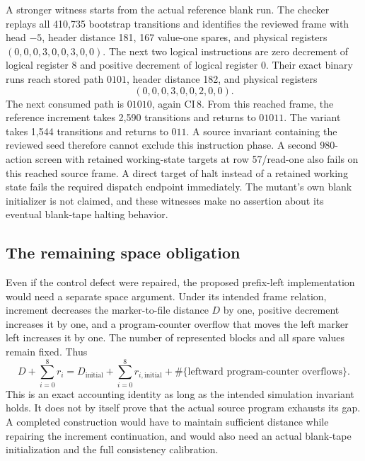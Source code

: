 A stronger witness starts from the actual reference blank run.  The checker
replays all 410,735 bootstrap transitions and identifies the reviewed frame
with head $-5$, header distance 181, 167 value-one spares, and physical registers
$(0,0,0,3,0,0,3,0,0)$.  The next two logical instructions are zero decrement
of logical register 8 and positive decrement of logical register 0.  Their
exact binary runs reach stored path $0101$, header distance 182, and physical
registers
\[
 (0,0,0,3,0,0,2,0,0).
\]
The next consumed path is $01010$, again $\mathrm{CI}\,8$.  From this reached
frame, the reference increment takes 2,590 transitions and returns to
$01011$.  The variant takes 1,544 transitions and returns to $011$.
A source invariant containing the reviewed seed therefore cannot exclude
this instruction phase.  A second 980-action screen with retained working-state targets at row 57/read-one also
fails on this reached source frame.  A direct target of halt instead of a retained working state fails the
required dispatch endpoint immediately.  The mutant's own blank initializer is
not claimed, and these witnesses make no assertion about its eventual
blank-tape halting behavior.

\subsection{The remaining space obligation}

Even if the control defect were repaired, the proposed prefix-left
implementation would need a separate space argument.  Under its intended
frame relation, increment decreases the marker-to-file distance $D$ by one,
positive decrement increases it by one, and a program-counter overflow that
moves the left marker left increases it by one.  The number of represented
blocks and all spare values remain fixed.  Thus
\[
 D+\sum_{i=0}^{8}r_i
 =D_{\mathrm{initial}}+\sum_{i=0}^{8}r_{i,\mathrm{initial}}
   +\#\{\text{leftward program-counter overflows}\}.
\]
This is an exact accounting identity as long as the intended simulation
invariant holds.  It does not by itself prove that the actual source program
exhausts its gap.  A completed construction would have to maintain sufficient
distance while repairing the increment continuation, and would also need an
actual blank-tape initialization and the full consistency calibration.
